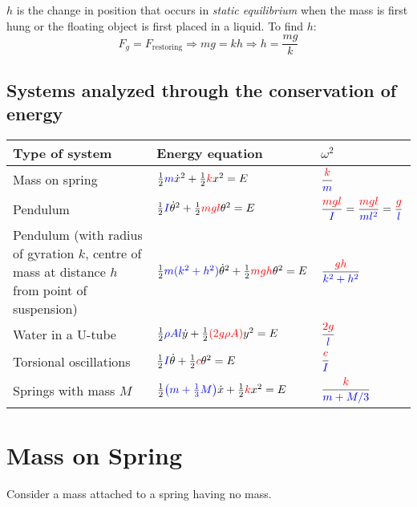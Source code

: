 \documentclass[11pt,letterpaper,titlepage,oneside]{book}
\begin{document}
$h$ is the change in position that occurs in \emph{static equilibrium} when the mass is first hung or the floating object is first placed in a liquid. To find $h$:
\[ F_g = F_\text{restoring}\Longrightarrow mg = kh \Longrightarrow h = \frac{mg}{k} \]

\subsection{Systems analyzed through the conservation of energy}
\begin{center}
	\renewcommand{\arraystretch}{2.5}
	\begin{tabular}[t]{lll}
		\hline
		Type of system & Energy equation & $\omega^2$ \\ \hline
		Mass on spring &
			$\frac{1}{2}\textcolor{blue}{m}\dot{x}^2 + \frac{1}{2}\textcolor{red}{k}x^2 = E $ &
			$\dfrac{\color{red}{k}}{\color{blue}m}$
			\\
		Pendulum &
			$\frac{1}{2}\textcolor{blue}{I}\dot{\theta}^2 + \frac{1}{2}\textcolor{red}{mgl}\theta^2 = E $ &
			$\dfrac{\color{red}{mgl}}{\color{blue}{I}} = \dfrac{\color{red}{mgl}}{\color{blue}{ml^2}}= \dfrac{\color{red}{g}}{\color{blue}{l}}$ 
			\\
		\parbox{5.5cm}{Pendulum \footnotesize(with radius of gyration $k$, centre of mass at distance $h$ from point of suspension)}&
			$\frac{1}{2}\textcolor{blue}{m(k^2+h^2)}\dot{\theta}^2 + \frac{1}{2}\textcolor{red}{mgh}\theta^2 = E $ &
			$\dfrac{\color{red}{gh}}{\color{blue}{k^2+h^2}}$ 
			\\
		Water in a U-tube &
			$\frac{1}{2}\textcolor{blue}{\rho Al}\dot{y} + \frac{1}{2}\textcolor{red}{(2g\rho A)}y^2 = E$ &
			$\dfrac{\color{red}{2g}}{\color{blue}l}$ 
			\\
		Torsional oscillations &
			$\frac{1}{2}\textcolor{blue}{I}\dot{\theta} + \frac{1}{2}\textcolor{red}{c}\theta^2 = E$ &
			$\dfrac{\color{red}{c}}{\color{blue}I}$ 
			\\
		Springs with mass $M$ &
			$\frac{1}{2}\textcolor{blue}{\left(m + \frac{1}{3}M \right)}\dot{x} + \frac{1}{2}\textcolor{red}{k}x^2 = E$ &
			$\dfrac{\color{red}{k}}{\color{blue}{m + M/3}}$ 
			\\
		\hline
	\end{tabular}
	\renewcommand{\arraystretch}{1}
\end{center}


\section{Mass on Spring}
Consider a mass attached to a spring having no mass.
\end{document}
